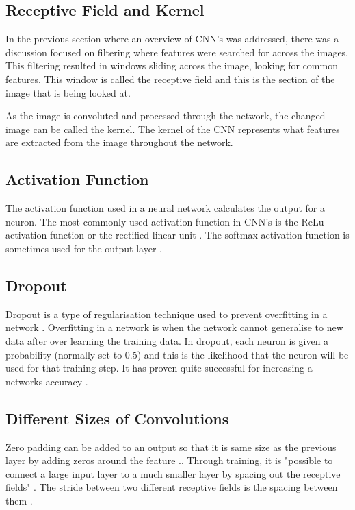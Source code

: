 
\subsection*{Receptive Field and Kernel}
In the previous section where an overview of CNN's was addressed, there was a discussion focused on filtering where features were searched for across the images.
This filtering resulted in windows sliding across the image, looking for common features.
This window is called the receptive field and this is the section of the image that is being looked at.

As the image is convoluted and processed through the network, the changed image can be called the kernel.
The kernel of the CNN represents what features are extracted from the image throughout the network.

\subsection*{Activation Function}
The activation function used in a neural network calculates the output for a neuron.
The most commonly used activation function in CNN's is the ReLu activation function or the rectified linear unit \parencite{handsOnML}.
The softmax activation function is sometimes used for the output layer \parencite{handsOnML}.

\subsection*{Dropout}
Dropout is a type of regularisation technique used to prevent overfitting in a network \parencite{handsOnML}.
Overfitting in a network is when the network cannot generalise to new data after over learning the training data.
In dropout, each neuron is given a probability (normally set to 0.5) and this is the likelihood that the neuron will be used for that training step.
It has proven quite successful for increasing a networks accuracy \parencite{handsOnML}.

\subsection*{Different Sizes of Convolutions}
Zero padding can be added to an output so that it is same size as the previous layer by adding zeros around the feature \parencite{handsOnML}..
Through training, it is "possible to connect a large input layer to a much smaller layer by spacing out the receptive fields" \parencite{handsOnML}.
The stride between two different receptive fields is the spacing between them \parencite{handsOnML}.

